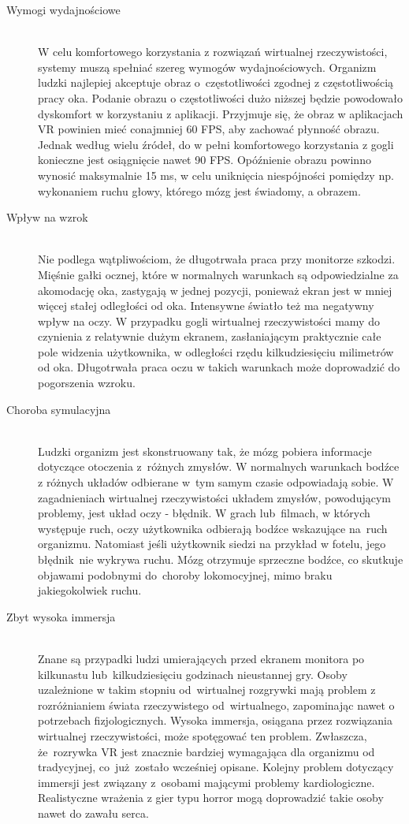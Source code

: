 \documentclass[a4paper,11pt,twoside]{report}
\theoremstyle{definition}
\begin{document}
\begin{description}
\item [Wymogi wydajnościowe] \hfill \\
W celu komfortowego korzystania z rozwiązań wirtualnej rzeczywistości, systemy muszą spełniać szereg wymogów wydajnościowych. Organizm ludzki najlepiej akceptuje obraz o~częstotliwości zgodnej z częstotliwością pracy oka. Podanie obrazu o częstotliwości dużo niższej będzie powodowało dyskomfort w korzystaniu z aplikacji. Przyjmuje się, że obraz w aplikacjach VR powinien mieć conajmniej 60 FPS, aby zachować płynność obrazu. Jednak według wielu źródeł, do w pełni komfortowego korzystania z gogli konieczne jest osiągnięcie nawet 90 FPS\cite{VRframesPerSecond}. Opóźnienie obrazu powinno wynosić maksymalnie 15 ms\cite{VRlatency}, w celu uniknięcia niespójności pomiędzy np. wykonaniem ruchu głowy, którego mózg jest świadomy, a obrazem.
\item [Wpływ na wzrok] \hfill \\
Nie podlega wątpliwościom, że długotrwała praca przy monitorze szkodzi. Mięśnie gałki ocznej, które w normalnych warunkach są odpowiedzialne za akomodację oka, zastygają w jednej pozycji, ponieważ ekran jest w mniej więcej stałej odległości od oka. Intensywne światło też ma negatywny wpływ na oczy. W przypadku gogli wirtualnej rzeczywistości mamy do czynienia z relatywnie dużym ekranem, zasłaniającym praktycznie całe pole widzenia użytkownika, w odległości rzędu kilkudziesięciu milimetrów od oka. Długotrwała praca oczu w takich warunkach może doprowadzić do pogorszenia wzroku.
\item [Choroba symulacyjna] \hfill \\
Ludzki organizm jest skonstruowany tak, że mózg pobiera informacje dotyczące otoczenia z~różnych zmysłów. W normalnych warunkach bodźce z różnych układów odbierane w~tym samym czasie odpowiadają sobie. W zagadnieniach wirtualnej rzeczywistości układem zmysłów, powodującym problemy, jest układ oczy - błędnik. W grach lub~filmach, w których występuje ruch, oczy użytkownika odbierają bodźce wskazujące na~ruch organizmu. Natomiast jeśli użytkownik siedzi na przykład w fotelu, jego błędnik~nie wykrywa ruchu. Mózg otrzymuje sprzeczne bodźce, co skutkuje objawami podobnymi do~choroby lokomocyjnej, mimo braku jakiegokolwiek ruchu.\cite{VRsickness}
\item [Zbyt wysoka immersja] \hfill \\
Znane są przypadki ludzi umierających przed ekranem monitora po kilkunastu lub~kilkudziesięciu godzinach nieustannej gry. Osoby uzależnione w takim stopniu od~wirtualnej rozgrywki mają problem z rozróżnianiem świata rzeczywistego od~wirtualnego, zapominając nawet o potrzebach fizjologicznych. Wysoka immersja, osiągana przez rozwiązania wirtualnej rzeczywistości, może spotęgować ten problem. Zwłaszcza, że~rozrywka VR jest znacznie bardziej wymagająca dla organizmu od tradycyjnej, co~już~zostało wcześniej opisane. 
Kolejny problem dotyczący immersji jest związany z~osobami mającymi problemy kardiologiczne. Realistyczne wrażenia z gier typu horror mogą doprowadzić takie osoby nawet do zawału serca.
\end{description}
\end{document}
